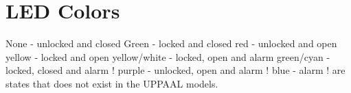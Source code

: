 \section{LED Colors}
\label{app:LEDColors}
None - unlocked and closed
\newline
Green - locked and closed
\newline
red - unlocked and open
\newline
yellow - locked and open
\newline
yellow/white - locked, open and alarm
\newline
green/cyan - locked, closed and alarm
\newline
! purple - unlocked, open and alarm
\newline
! blue - alarm
\newline
! are states that does not exist in the UPPAAL models.